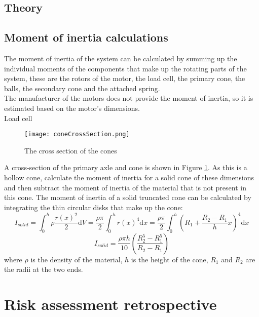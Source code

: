 \documentclass[12pt]{article}
\begin{document}
\subsection{Theory}

\subsection{Moment of inertia calculations}
The moment of inertia of the system can be calculated by summing up the individual moments of the components that make up the rotating parts of the system, these are the rotors of the motor, the load cell, the primary cone, the balls, the secondary cone and the attached spring. \\

The manufacturer of the motors does not provide the moment of inertia, so it is estimated based on the motor's dimensions. \todo \\

Load cell \todo

\begin{figure}
    \centering
    \texttt{[image: coneCrossSection.png]}
    \caption{The cross section of the cones}
    \label{fig:coneCrossSection}
\end{figure}

A cross-section of the primary axle and cone is shown in Figure \ref{fig:coneCrossSection}. As this is a hollow cone, calculate the moment of inertia for a solid cone of these dimensions and then subtract the moment of inertia of the material that is not present in this cone.
The moment of inertia of a solid truncated cone can be calculated by integrating the thin circular disks that make up the cone:
$$I_{solid} = \int_0^h \rho \frac{r(x)^2}{2} \text{d}V = \frac{\rho \pi }{2} \int_0^h r(x)^4 \text{d}x =\frac{\rho \pi }{2} \int_0^h \left( R_1 + \frac{R_2-R_1}{h}x \right)^4 \text{d}x $$
$$I_{solid} = \frac{\rho \pi h }{10}\left( \frac{R_2^5-R_1^5}{R_2-R_1}\right)$$
where $\rho$ is the density of the material, $h$ is the height of the cone, $R_1$ and $R_2$ are the radii at the two ends.












\section{Risk assessment retrospective}

\printbibliography
\end{document}
